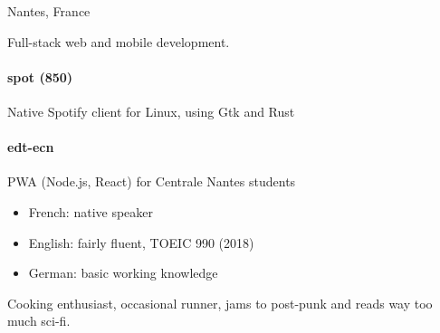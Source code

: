\documentclass{cv}
\begin{document}
\hfill
\begin{minipage}[t]{0.28\textwidth}%


	 Nantes, France
	\newline{} %
	\newline{} \href{mailto:%
	}{\link{%
	}}%
	\newline{} \href{https://github.com/xou816}{} 



	Full-stack web and mobile development.

	\begin{center}
		  
		  
		  
		  
	\end{center}

	\raggedright
	\paragraph{spot {\footnotesize(\faStar{}850)}} Native Spotify client for Linux, using Gtk and Rust
	\paragraph{edt-ecn} PWA (Node.js, React) for Centrale Nantes students


	\begin{itemize}
	\setlength\itemsep{0pt}
	\item French: native speaker
	\item English: fairly fluent, TOEIC 990 (2018)
	\item German: basic working knowledge
	\end{itemize}


	Cooking enthusiast, occasional runner, jams to post-punk and reads way too much sci-fi. 
		
\end{minipage}
\end{document}
